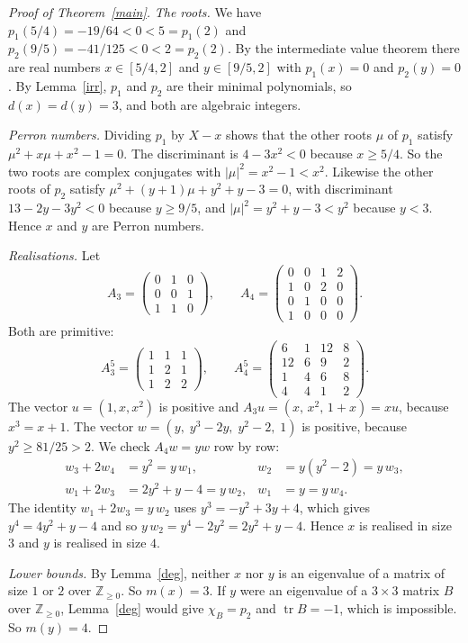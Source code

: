 \documentclass[11pt]{article}
\theoremstyle{remark}
\begin{document}
\begin{proof}[Proof of Theorem~\ref{main}]
\emph{The roots.} We have $p_1(5/4)=-19/64<0<5=p_1(2)$ and
$p_2(9/5)=-41/125<0<2=p_2(2)$. By the intermediate value theorem there
are real numbers $x\in[5/4,2]$ and $y\in[9/5,2]$ with $p_1(x)=0$ and
$p_2(y)=0$. By Lemma~\ref{irr}, $p_1$ and $p_2$ are their minimal
polynomials, so $d(x)=d(y)=3$, and both are algebraic integers.

\emph{Perron numbers.} Dividing $p_1$ by $X-x$ shows that the other
roots $\mu$ of $p_1$ satisfy $\mu^2+x\mu+x^2-1=0$. The discriminant is
$4-3x^2<0$ because $x\ge 5/4$. So the two roots are complex conjugates
with $|\mu|^2=x^2-1<x^2$. Likewise the other roots of $p_2$ satisfy
$\mu^2+(y+1)\mu+y^2+y-3=0$, with discriminant $13-2y-3y^2<0$ because
$y\ge 9/5$, and $|\mu|^2=y^2+y-3<y^2$ because $y<3$. Hence $x$ and $y$
are Perron numbers.

\emph{Realisations.} Let
\[
 A_3=\begin{pmatrix}0&1&0\\0&0&1\\1&1&0\end{pmatrix},\qquad
 A_4=\begin{pmatrix}0&0&1&2\\1&0&2&0\\0&1&0&0\\1&0&0&0\end{pmatrix}.
\]
Both are primitive:
\[
 A_3^5=\begin{pmatrix}1&1&1\\1&2&1\\1&2&2\end{pmatrix},\qquad
 A_4^5=\begin{pmatrix}6&1&12&8\\12&6&9&2\\1&4&6&8\\4&4&1&2\end{pmatrix}.
\]
The vector $u=(1,x,x^2)$ is positive and
$A_3u=(x,\,x^2,\,1+x)=xu$, because $x^3=x+1$.
The vector $w=(y,\;y^3-2y,\;y^2-2,\;1)$ is positive, because
$y^2\ge 81/25>2$. We check $A_4w=yw$ row by row:
\begin{align*}
 w_3+2w_4&=y^2=y\,w_1, & w_2&=y(y^2-2)=y\,w_3,\\
 w_1+2w_3&=2y^2+y-4=y\,w_2, & w_1&=y=y\,w_4 .
\end{align*}
The identity $w_1+2w_3=y\,w_2$ uses $y^3=-y^2+3y+4$, which gives
$y^4=4y^2+y-4$ and so $y\,w_2=y^4-2y^2=2y^2+y-4$. Hence $x$ is realised
in size $3$ and $y$ is realised in size $4$.

\emph{Lower bounds.} By Lemma~\ref{deg}, neither $x$ nor $y$ is an
eigenvalue of a matrix of size $1$ or $2$ over $\mathbb{Z}_{\ge0}$. So
$m(x)=3$. If $y$ were an eigenvalue of a $3\times3$ matrix $B$ over
$\mathbb{Z}_{\ge0}$, Lemma~\ref{deg} would give $\chi_B=p_2$ and
$\operatorname{tr}B=-1$, which is impossible. So $m(y)=4$.
\end{proof}
\end{document}
